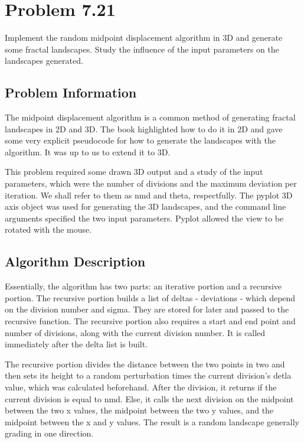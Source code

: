 \section{Problem 7.21}

Implement the random midpoint displacement algorithm in 3D and generate some fractal landscapes.  Study the influence of the input parameters on the landscapes generated.

\subsection{Problem Information}

The midpoint displacement algorithm is a common method of generating fractal landscapes in 2D and 3D.  The book highlighted how to do it in 2D and gave some very explicit pseudocode for how to generate the landscapes with the algorithm.  It was up to us to extend it to 3D.

This problem required some drawn 3D output and a study of the input parameters, which were the number of divisions and the maximum deviation per iteration.  We shall refer to them as nmd and theta, respectfully.  The pyplot 3D axis object was used for generating the 3D landscapes, and the command line arguments specified the two input parameters.  Pyplot allowed the view to be rotated with the mouse.

\subsection{Algorithm Description}

Essentially, the algorithm has two parts: an iterative portion and a recursive portion.  The recursive portion builds a list of deltas - deviations - which depend on the division number and sigma.  They are stored for later and passed to the recursive function.  The recursive portion also requires a start and end point and number of divisions, along with the current division number.  It is called immediately after the delta list is built.

The recursive portion divides the distance between the two points in two and then sets its height to a random perturbation times the current division's detla value, which was calculated beforehand.  After the division, it returns if the current division is equal to nmd.  Else, it calls the next division on the midpoint between the two x values, the midpoint between the two y values, and the midpoint between the x and y values.  The result is a random landscape generally grading in one direction.

